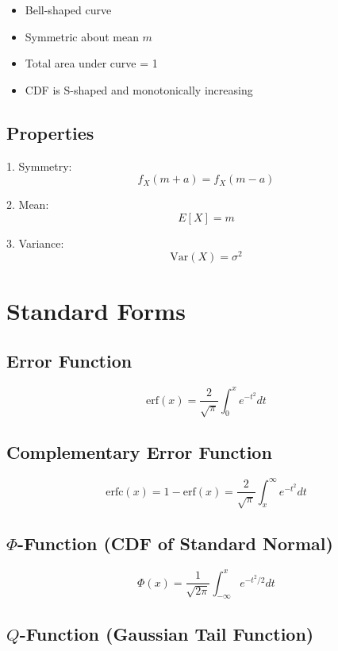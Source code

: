 \documentclass[11pt]{article}
\begin{document}
\begin{itemize}
    \item Bell-shaped curve
    \item Symmetric about mean $m$
    \item Total area under curve = 1
    \item CDF is S-shaped and monotonically increasing
\end{itemize}

\subsection*{Properties}

1. Symmetry:
\[
f_X(m+a) = f_X(m-a)
\]

2. Mean:
\[
E[X] = m
\]

3. Variance:
\[
\text{Var}(X) = \sigma^2
\]

\newpage

\section*{Standard Forms}

\subsection*{Error Function}

\[
\text{erf}(x) =
\frac{2}{\sqrt{\pi}}
\int_0^x e^{-t^2} dt
\]

\subsection*{Complementary Error Function}

\[
\text{erfc}(x)
=
1 - \text{erf}(x)
=
\frac{2}{\sqrt{\pi}}
\int_x^\infty e^{-t^2} dt
\]

\subsection*{$\Phi$-Function (CDF of Standard Normal)}

\[
\Phi(x)
=
\frac{1}{\sqrt{2\pi}}
\int_{-\infty}^{x}
e^{-t^2/2} dt
\]

\subsection*{$Q$-Function (Gaussian Tail Function)}
\end{document}
